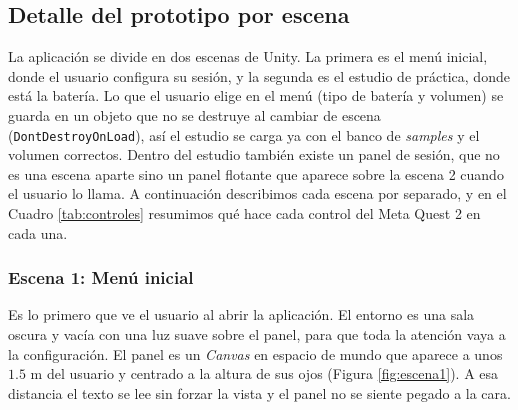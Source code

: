 \documentclass{article}
\begin{document}
\subsection{Detalle del prototipo por escena}
\label{sec:escenas}
La aplicación se divide en dos escenas de Unity. La primera es el menú inicial, donde el usuario configura su sesión, y la segunda es el estudio de práctica, donde está la batería. Lo que el usuario elige en el menú (tipo de batería y volumen) se guarda en un objeto que no se destruye al cambiar de escena (\texttt{DontDestroyOnLoad}), así el estudio se carga ya con el banco de \textit{samples} y el volumen correctos. Dentro del estudio también existe un panel de sesión, que no es una escena aparte sino un panel flotante que aparece sobre la escena 2 cuando el usuario lo llama. A continuación describimos cada escena por separado, y en el Cuadro \ref{tab:controles} resumimos qué hace cada control del Meta Quest 2 en cada una.

\subsubsection{Escena 1: Menú inicial}
Es lo primero que ve el usuario al abrir la aplicación. El entorno es una sala oscura y vacía con una luz suave sobre el panel, para que toda la atención vaya a la configuración. El panel es un \textit{Canvas} en espacio de mundo que aparece a unos $1.5$ m del usuario y centrado a la altura de sus ojos (Figura \ref{fig:escena1}). A esa distancia el texto se lee sin forzar la vista y el panel no se siente pegado a la cara.
\end{document}
